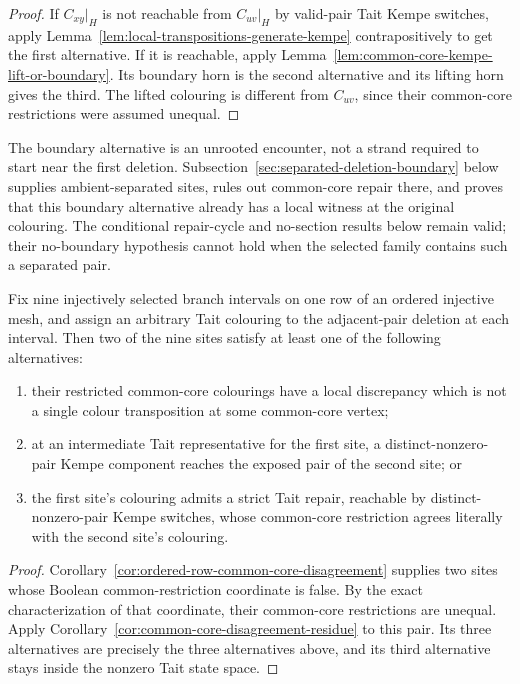 \begin{proof}
If \(C_{xy}|_H\) is not reachable from \(C_{uv}|_H\) by valid-pair
Tait Kempe switches, apply
Lemma~\ref{lem:local-transpositions-generate-kempe} contrapositively to get
the first alternative.  If it is reachable, apply
Lemma~\ref{lem:common-core-kempe-lift-or-boundary}.  Its boundary horn is
the second alternative and its lifting horn gives the third.  The lifted
colouring is different from \(C_{uv}\), since their common-core
restrictions were assumed unequal.
\end{proof}

The boundary alternative is an unrooted encounter, not a strand required
to start near the first deletion. Subsection~\ref{sec:separated-deletion-boundary}
below supplies ambient-separated sites, rules out common-core repair
there, and proves that this boundary alternative already has a local
witness at the original colouring. The conditional repair-cycle and
no-section results below remain valid; their no-boundary hypothesis
cannot hold when the selected family contains such a separated pair.

\begin{corollary}
\label{cor:nine-site-tait-common-core-residue}
Fix nine injectively selected branch intervals on one row of an ordered
injective mesh, and assign an arbitrary Tait colouring to the adjacent-pair
deletion at each interval.  Then two of the nine sites satisfy at least one
of the following alternatives:
\begin{enumerate}
\item their restricted common-core colourings have a local discrepancy which
      is not a single colour transposition at some common-core vertex;
\item at an intermediate Tait representative for the first site, a
      distinct-nonzero-pair Kempe component reaches the exposed pair of the
      second site; or
\item the first site's colouring admits a strict Tait repair, reachable by
      distinct-nonzero-pair Kempe switches, whose common-core restriction
      agrees literally with the second site's colouring.
\end{enumerate}
\end{corollary}

\begin{proof}
Corollary~\ref{cor:ordered-row-common-core-disagreement} supplies two sites
whose Boolean common-restriction coordinate is false.  By the exact
characterization of that coordinate, their common-core restrictions are
unequal.  Apply Corollary~\ref{cor:common-core-disagreement-residue} to this
pair.  Its three alternatives are precisely the three alternatives above,
and its third alternative stays inside the nonzero Tait state space.
\end{proof}

